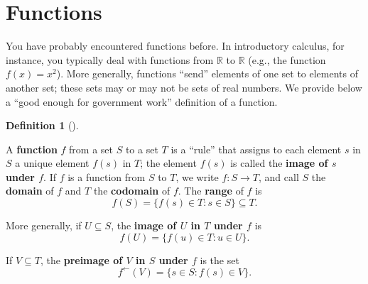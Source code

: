 \documentclass[10pt,]{book}
\newcommand{\terminology}[1]{\textbf{#1}}
\theoremstyle{plain}
\theoremstyle{definition}
\newtheorem{definition}[theorem]{Definition}
\theoremstyle{definition}
\theoremstyle{definition}
\theoremstyle{definition}
\numberwithin{equation}{section}
\def\R{\mathbb{R}}
\begin{document}
\section[{Functions}]{Functions}\label{section-2}

    You have probably encountered functions before. In introductory
    calculus, for instance, you typically deal with functions from
    \(\R\) to \(\R\) (e.g., the function \(f(x)=x^2\)). More generally,
    functions ``send'' elements of one set to elements of another set;
    these sets may or may not be sets of real numbers. We provide below
    a ``good enough for government work'' definition of a function.
\begin{definition}[{}]\label{definition-8}

        A \terminology{function} \(f\) from a set \(S\) to a set \(T\) is a
        ``rule'' that assigns to each element \(s\) in \(S\) a unique
        element \(f(s)\) in \(T\); the element \(f(s)\) is called the \terminology{image of \(s\) under \(f\)}. If \(f\) is a function from \(S\) to \(T\),
        we write \(f: S \to T\), and call \(S\) the \terminology{domain} of \(f\) and
        \(T\) the \terminology{codomain} of \(f\). The \terminology{range} of \(f\) is
\begin{equation*}

          f(S)=\{f(s) \in T : s \in S\} \subseteq T.
        
\end{equation*}

\par

        More generally, if \(U \subseteq S\), the \terminology{image of \(U\) in \(T\) under \(f\)} is
\begin{equation*}

          f(U)=\{f(u)\in T : u\in U\}.
        
\end{equation*}

\par

        If \(V\subseteq T\), the \terminology{preimage of \(V\) in \(S\) under \(f\)} is the set
\begin{equation*}

          f^{\leftarrow}(V)=\{s\in S: f(s)\in V\}.
        
\end{equation*}

\label{notation-23}
\label{notation-24}
\label{notation-25}
\end{definition}
\end{document}
